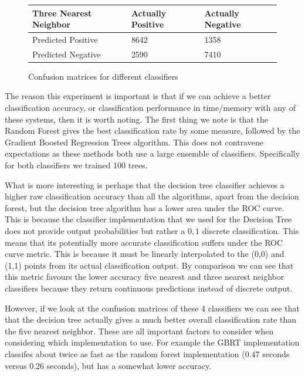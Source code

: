 \documentclass[ %
                    author={Sam Phippen},
                supervisor={Dr. Rafal Bogacz},
                     title={Real time voice activity detectors in noisy personal computing environments},
                  subtitle={},
                    degree={MEng},
                      year={2012} ]{thesis}
\begin{document}
\begin{figure}
    \begin{tabular}{|l||l|l|}
        \hline
        Three Nearest Neighbor & Actually Positive & Actually Negative \\ \hline
        Predicted Positive     & 8642              & 1358               \\ \hline
        Predicted Negative     & 2590              & 7410              \\ \hline
    \end{tabular}

    \vspace{0.75cm}

    \caption{Confusion matrices for different classifiers}

\end{figure}

The reason this experiment is important is that if we can achieve a better
classification accuracy, or classification performance in time/memory with any
of these systems, then it is worth noting. The first thing we note is that the
Random Forest gives the best classification rate by some measure, followed by
the Gradient Boosted Regression Trees algorithm. This does not contravene
expectations as these methods both use a large ensemble of classifiers.
Specifically for both classifiers we trained 100 trees.

What is more interesting is perhaps that the decision tree classifier achieves
a higher raw classification accuracy than all the algorithms, apart from the
decision forest, but the decision tree algorithm has a lower area under the ROC
curve. This is because the classifier implementation that we used for the
Decision Tree does not provide output probabilities but rather a ${0,1}$
discrete classification. This means that its potentially more accurate
classification suffers under the ROC curve metric. This is because it must be
linearly interpolated to the (0,0) and (1,1) points from its actual
classification output. By comparison we can see that this metric favours the
lower accuracy five nearest and three nearest neighbor classifiers because they
return continuous predictions instead of discrete output.

However, if we look at the confusion matrices of these 4 classifiers we can see
that that the decision tree actually gives a much better overall classification
rate than the five nearest neighbor. These are all important factors to
consider when considering which implementation to use. For example the GBRT
implementation classifes about twice as fast as the random forest
implementation (0.47 seconds versus 0.26 seconds), but has a somewhat lower
accuracy.
\end{document}
